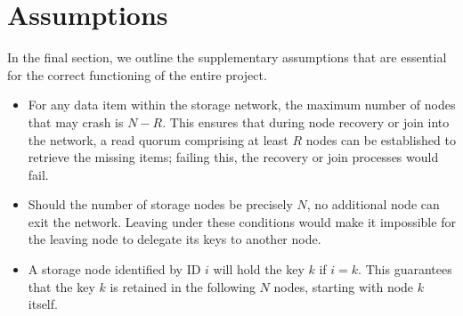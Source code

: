 \documentclass[a4paper, 11pt]{article}
\begin{document}
\section{Assumptions}
In the final section, we outline the supplementary assumptions that are essential for the correct functioning of the entire project.
\begin{itemize}
    \item For any data item within the storage network, the maximum number of nodes that may crash is $N-R$. This ensures that during node recovery or join into the network, a read quorum comprising at least $R$ nodes can be established to retrieve the missing items; failing this, the recovery or join processes would fail.
    \item Should the number of storage nodes be precisely $N$, no additional node can exit the network. Leaving under these conditions would make it impossible for the leaving node to delegate its keys to another node.
    \item A storage node identified by ID $i$ will hold the key $k$ if $i = k$. This guarantees that the key $k$ is retained in the following $N$ nodes, starting with node $k$ itself.
\end{itemize}
\end{document}
